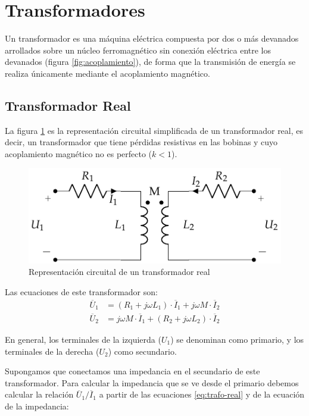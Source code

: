 \section{Transformadores}
\label{sec:transformadores}

Un transformador es una máquina eléctrica compuesta por dos o más
devanados arrollados sobre un núcleo ferromagnético sin conexión
eléctrica entre los devanados (figura \ref{fig:acoplamiento}), de
forma que la transmisión de energía se realiza únicamente mediante el
acoplamiento magnético.

\subsection{Transformador Real}
\label{sec:transformador-real}

La figura \ref{fig:trafo-real} es la representación circuital
simplificada de un transformador real, es decir, un transformador que
tiene pérdidas resistivas en las bobinas y cuyo acoplamiento magnético
no es perfecto ($k < 1$).

\begin{figure}
  \centering
  \includegraphics[height=0.2\textheight]{../figs/Trafo_Real.pdf}
  \caption{Representación circuital de un transformador real}
  \label{fig:trafo-real}
\end{figure}
Las ecuaciones de este transformador son:
\begin{align}
  \label{eq:trafo-real}
  \overline{U}_1 &= (R_1 + j \omega L_1) \cdot \overline{I}_1 + j \omega M \cdot\overline{I}_2\\
  \overline{U}_2 &= j \omega M \cdot \overline{I}_1 + (R_2 + j \omega L_2) \cdot \overline{I}_2
\end{align}

En general, los terminales de la izquierda ($U_1$) se denominan como
primario, y los terminales de la derecha ($U_2$) como secundario.

Supongamos que conectamos una impedancia en el secundario de este
transformador. Para calcular la impedancia que se ve desde el primario
debemos calcular la relación $\overline{U}_1/\overline{I}_1$ a partir
de las ecuaciones \ref{eq:trafo-real} y de la ecuación de la
impedancia:

